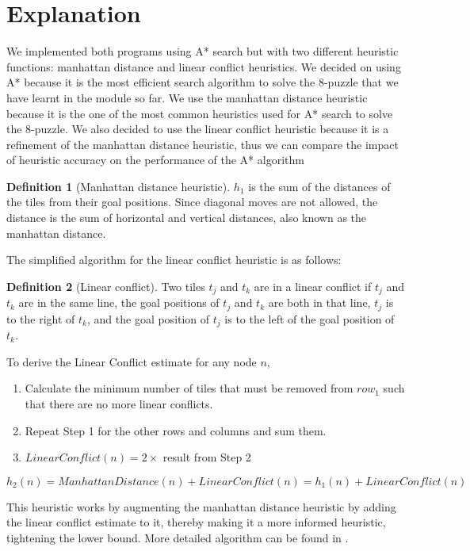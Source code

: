 \documentclass[10pt, a4paper]{article}
\theoremstyle{definition}
\newtheorem{definition}{Definition}
\begin{document}
\section{Explanation}
We implemented both programs using A* search but with two different heuristic functions: manhattan distance and linear conflict heuristics.
We decided on using A* because it is the most efficient search algorithm to solve the 8-puzzle that we have learnt in the module so far.
We use the manhattan distance heuristic because it is the one of the most common heuristics used for A* search to solve the 8-puzzle.
We also decided to use the linear conflict heuristic because it is a refinement of the manhattan distance heuristic, thus we can compare the impact of heuristic accuracy on the performance of the A* algorithm

\begin{definition}[Manhattan distance heuristic]
  $h_1$ is the sum of the distances of the tiles from their goal positions. Since diagonal moves are not allowed, the distance is the sum of horizontal and vertical distances, also known as the manhattan distance.
\end{definition}

The simplified algorithm for the linear conflict heuristic is as follows:

\begin{definition}[Linear conflict]
  Two tiles $t_j$ and $t_k$ are in a linear conflict if $t_j$ and $t_k$ are in the same line, the goal positions of $t_j$ and $t_k$ are both in that line, $t_j$ is to the right of $t_k$, and the goal position of $t_j$ is to the left of the goal position of $t_k$.
\end{definition}

To derive the Linear Conflict estimate for any node $n$,
\begin{enumerate}
  \item Calculate the minimum number of tiles that must be removed from $row_1$ such that there are no more linear conflicts.
  \item Repeat Step 1 for the other rows and columns and sum them.
  \item $LinearConflict(n) = 2 \times $ result from Step 2
\end{enumerate}
\begin{equation*}
  h_2(n) = ManhattanDistance(n) + LinearConflict(n) = h_1(n) + LinearConflict(n)
\end{equation*}

This heuristic works by augmenting the manhattan distance heuristic by adding the linear conflict estimate to it, thereby making it a more informed heuristic, tightening the lower bound. More detailed algorithm can be found in .
\end{document}
